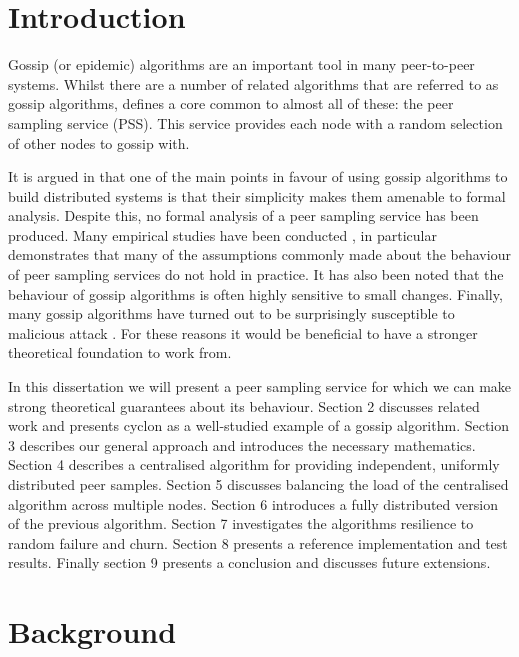 \documentclass[a4paper,10pt]{article}
\date{2010-08-23}
\begin{document}
\section{Introduction}

Gossip (or epidemic) algorithms are an important tool in many peer-to-peer systems. Whilst there are a number of related algorithms that are referred to as gossip algorithms, \cite{pss} defines a core common to almost all of these: the peer sampling service (PSS). This service provides each node with a random selection of other nodes to gossip with. 

It is argued in \cite{formal_analysis} that one of the main points in favour of using gossip algorithms to build distributed systems is that their simplicity makes them amenable to formal analysis. Despite this, no formal analysis of a peer sampling service has been produced. Many empirical studies have been conducted \cite{pss, formal_analysis}, in particular \cite{pss} demonstrates that many of the assumptions commonly made about the behaviour of peer sampling services do not hold in practice. It has also been noted \cite{pss, arrg, how_robust, emergent_gossip} that the behaviour of gossip algorithms is often highly sensitive to small changes. Finally, many gossip algorithms have turned out to be surprisingly susceptible to malicious attack \cite{poison, poison_buddycast, poison_mosquito, poison_antimosquito}. For these reasons it would be beneficial to have a stronger theoretical foundation to work from.

In this dissertation we will present a peer sampling service for which we can make strong theoretical guarantees about its behaviour. Section 2 discusses related work and presents cyclon as a well-studied example of a gossip algorithm. Section 3 describes our general approach and introduces the necessary mathematics. Section 4 describes a centralised algorithm for providing independent, uniformly distributed peer samples. Section 5 discusses balancing the load of the centralised algorithm across multiple nodes. Section 6 introduces a fully distributed version of the previous algorithm. Section 7 investigates the algorithms resilience to random failure and churn. Section 8 presents a reference implementation and test results. Finally section 9 presents a conclusion and discusses future extensions.

\section{Background}
\end{document}
